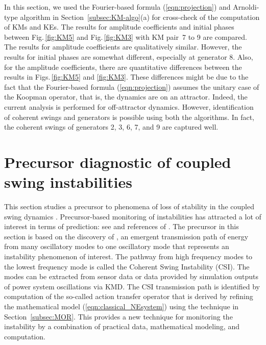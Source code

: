\documentclass[a4paper,10pt]{article}
\begin{document}
%
In this section, we used the Fourier-based formula (\ref{eqn:projection}) and Arnoldi-type algorithm in Section~\ref{subsec:KM-algo}(a) for cross-check of the computation of KMs and KEs.  
The results for amplitude coefficients and initial phases between Fig.\,\ref{fig:KM5} and Fig.\,\ref{fig:KM3} with KM pair~7 to 9 are compared.  
The results for amplitude coefficients are qualitatively similar.  
However, the results for initial phases are somewhat different, especially at generator 8.  
Also, for the amplitude coefficients, there are quantitative differences between the results in Figs.\,\ref{fig:KM5} and \ref{fig:KM3}.  
These differences might be due to the fact that the Fourier-based formula (\ref{eqn:projection}) assumes the unitary case of the Koopman operator, that is, the dynamics are on an attractor.  
Indeed, the current analysis is performed for off-attractor dynamics.  
However, identification of coherent swings and generators is possible using both the algorithms.  
In fact, the coherent swings of generators 2, 3, 6, 7, and 9 are captured well.  


\section{Precursor diagnostic of coupled swing instabilities}
\label{sec:precursor}

This section studies a precursor to phenomena of loss of stability in the coupled swing dynamics \cite{Susuki_IEEETPWRS27}.  
Precursor-based monitoring of instabilities has attracted a lot of interest in terms of prediction:  see \cite{Tamura_IEEETPWRS2,Dobson_IEEETCASI48,Wiesenfeld_JSP38} and references of \cite{Susuki_IEEETPWRS27}.  
The precursor in this section is based on the discovery of \cite{Susuki_JNLS09}, an emergent transmission path of energy from many oscillatory modes to one oscillatory mode that represents an instability phenomenon of interest.
The pathway from high frequency modes to the lowest frequency mode is called the Coherent Swing Instability (CSI).    
The modes can be extracted from sensor data or data provided by simulation outputs of power system oscillations via KMD.  
The CSI transmission path is identified by computation of the so-called action transfer operator that is derived by refining the mathematical model (\ref{eqn:classical_NEsystem}) using the technique in Section~\ref{subsec:MOR}.  
This provides a new technique for monitoring the instability by a combination of practical data, mathematical modeling, and computation.  
\end{document}
